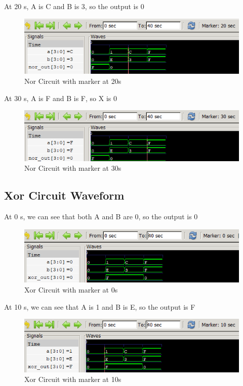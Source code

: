 \documentclass[12pt]{article}
\begin{document}
At 20 s, A is C and B is 3, so the output is 0
\begin{figure}[h]
    \centering
    \includegraphics[width = 1.0\textwidth]{figs/Nor20.png}
    \caption{Nor Circuit with marker at 20s}
    \label{fig:enter-label}
\end{figure}

\newpage

At 30 s, A is F and B is F, so X is 0
\begin{figure}[h]
    \centering
    \includegraphics[width = 1.0\textwidth]{figs/Nor30.png}
    \caption{Nor Circuit with marker at 30s}
    \label{fig:enter-label}
\end{figure}




\subsection{Xor Circuit Waveform}

At 0 s, we can see that both A and B are 0, so the output is 0
\begin{figure}[h]
    \centering
    \includegraphics[width = 1.0\textwidth]{figs/Xor0.png}
    \caption{Xor Circuit with marker at 0s}
    \label{fig:enter-label}
\end{figure}

\newpage

At 10 s, we can see that A is 1 and B is E, so the output is F
\begin{figure}[h]
    \centering
    \includegraphics[width = 1.0\textwidth]{figs/Xor10.png}
    \caption{Xor Circuit with marker at 10s}
    \label{fig:enter-label}
\end{figure}
\end{document}
